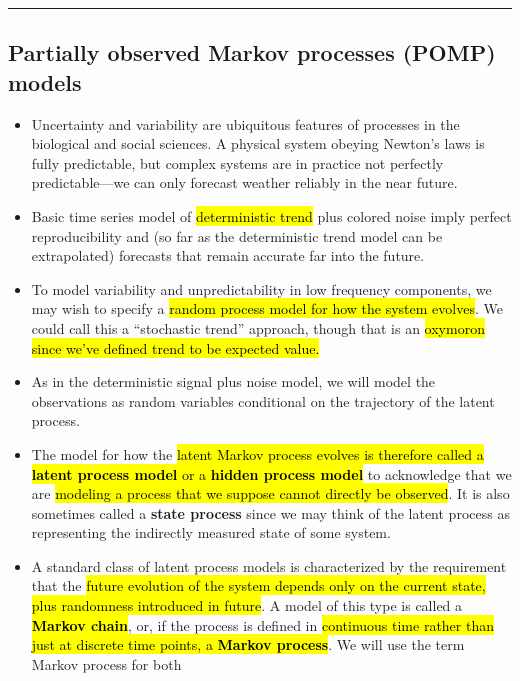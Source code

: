 \documentclass[]{article}
\begin{document}
\begin{center}\rule{0.5\linewidth}{\linethickness}\end{center}

\subsection{Partially observed Markov processes (POMP)
models}\label{partially-observed-markov-processes-pomp-models}

\begin{itemize}
\item
  Uncertainty and variability are ubiquitous features of processes in
  the biological and social sciences. A physical system obeying Newton's
  laws is fully predictable, but complex systems are in practice not
  perfectly predictable---we can only forecast weather reliably in the
  near future.
\item
  Basic time series model of \hl{deterministic trend} plus colored noise
  imply perfect reproducibility and (so far as the deterministic trend
  model can be extrapolated) forecasts that remain accurate far into the
  future.
\item
  To model variability and unpredictability in low frequency components,
  we may wish to specify a \hl{random process model for how the system
  evolves}. We could call this a ``stochastic trend'' approach, though
  that is an \hl{oxymoron since we've defined trend to be expected value.}
\item
  As in the deterministic signal plus noise model, we will model the
  observations as random variables conditional on the trajectory of the
  latent process.
\item
  The model for how the \hl{latent Markov process evolves is therefore
  called a \textbf{latent process model} or a \textbf{hidden process
  model}} to acknowledge that we are \hl{modeling a process that we suppose
  cannot directly be observed}. It is also sometimes called a
  \textbf{state process} since we may think of the latent process as
  representing the indirectly measured state of some system.
\item
  A standard class of latent process models is characterized by the
  requirement that the \hl{future evolution of the system depends only on
  the current state, plus randomness introduced in future}. A model of
  this type is called a \hl{\textbf{Markov chain}}, or, if the process is
  defined in \hl{continuous time rather than just at discrete time points, a
  \textbf{Markov process}}. We will use the term Markov process for both

\end{itemize}
\end{document}
